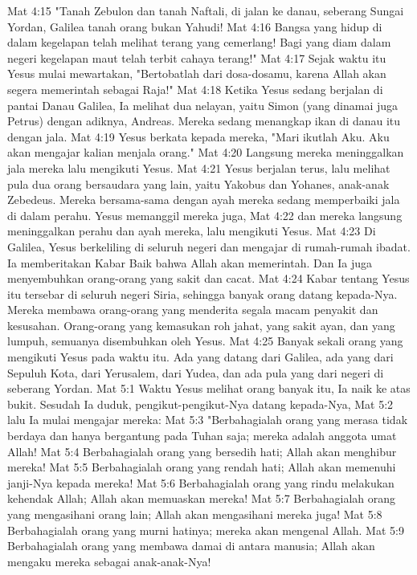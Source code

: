Mat 4:15  "Tanah Zebulon dan tanah Naftali, di jalan ke danau, seberang Sungai Yordan, Galilea tanah orang bukan Yahudi!
Mat 4:16  Bangsa yang hidup di dalam kegelapan telah melihat terang yang cemerlang! Bagi yang diam dalam negeri kegelapan maut telah terbit cahaya terang!"
Mat 4:17  Sejak waktu itu Yesus mulai mewartakan, "Bertobatlah dari dosa-dosamu, karena Allah akan segera memerintah sebagai Raja!"
Mat 4:18  Ketika Yesus sedang berjalan di pantai Danau Galilea, Ia melihat dua nelayan, yaitu Simon (yang dinamai juga Petrus) dengan adiknya, Andreas. Mereka sedang menangkap ikan di danau itu dengan jala.
Mat 4:19  Yesus berkata kepada mereka, "Mari ikutlah Aku. Aku akan mengajar kalian menjala orang."
Mat 4:20  Langsung mereka meninggalkan jala mereka lalu mengikuti Yesus.
Mat 4:21  Yesus berjalan terus, lalu melihat pula dua orang bersaudara yang lain, yaitu Yakobus dan Yohanes, anak-anak Zebedeus. Mereka bersama-sama dengan ayah mereka sedang memperbaiki jala di dalam perahu. Yesus memanggil mereka juga,
Mat 4:22  dan mereka langsung meninggalkan perahu dan ayah mereka, lalu mengikuti Yesus.
Mat 4:23  Di Galilea, Yesus berkeliling di seluruh negeri dan mengajar di rumah-rumah ibadat. Ia memberitakan Kabar Baik bahwa Allah akan memerintah. Dan Ia juga menyembuhkan orang-orang yang sakit dan cacat.
Mat 4:24  Kabar tentang Yesus itu tersebar di seluruh negeri Siria, sehingga banyak orang datang kepada-Nya. Mereka membawa orang-orang yang menderita segala macam penyakit dan kesusahan. Orang-orang yang kemasukan roh jahat, yang sakit ayan, dan yang lumpuh, semuanya disembuhkan oleh Yesus.
Mat 4:25  Banyak sekali orang yang mengikuti Yesus pada waktu itu. Ada yang datang dari Galilea, ada yang dari Sepuluh Kota, dari Yerusalem, dari Yudea, dan ada pula yang dari negeri di seberang Yordan.
Mat 5:1  Waktu Yesus melihat orang banyak itu, Ia naik ke atas bukit. Sesudah Ia duduk, pengikut-pengikut-Nya datang kepada-Nya,
Mat 5:2  lalu Ia mulai mengajar mereka:
Mat 5:3  "Berbahagialah orang yang merasa tidak berdaya dan hanya bergantung pada Tuhan saja; mereka adalah anggota umat Allah!
Mat 5:4  Berbahagialah orang yang bersedih hati; Allah akan menghibur mereka!
Mat 5:5  Berbahagialah orang yang rendah hati; Allah akan memenuhi janji-Nya kepada mereka!
Mat 5:6  Berbahagialah orang yang rindu melakukan kehendak Allah; Allah akan memuaskan mereka!
Mat 5:7  Berbahagialah orang yang mengasihani orang lain; Allah akan mengasihani mereka juga!
Mat 5:8  Berbahagialah orang yang murni hatinya; mereka akan mengenal Allah.
Mat 5:9  Berbahagialah orang yang membawa damai di antara manusia; Allah akan mengaku mereka sebagai anak-anak-Nya!

